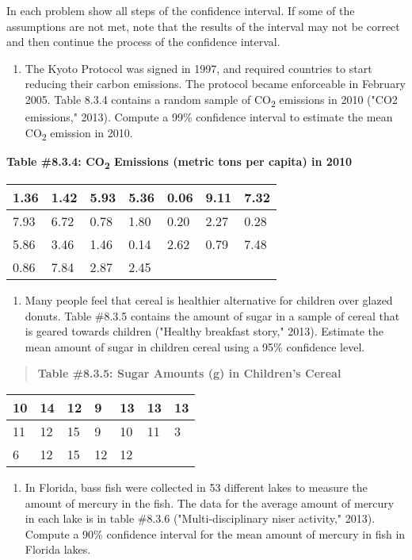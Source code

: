 \documentclass[]{book}
\providecommand{\tightlist}{%
  \setlength{\itemsep}{0pt}\setlength{\parskip}{0pt}}
\begin{document}
In each problem show all steps of the confidence interval. If some of the assumptions are not met, note that the results of the interval may not be correct and then continue the process of the confidence interval.

\begin{enumerate}
\def\labelenumi{\arabic{enumi}.}
\tightlist
\item
  The Kyoto Protocol was signed in 1997, and required countries to start reducing their carbon emissions. The protocol became enforceable in February 2005. Table 8.3.4 contains a random sample of CO\textsubscript{2} emissions in 2010 ("CO2 emissions," 2013). Compute a 99\% confidence interval to estimate the mean CO\textsubscript{2} emission in 2010.
\end{enumerate}

\textbf{Table \#8.3.4: CO\textsubscript{2} Emissions (metric tons per capita) in 2010}

\begin{longtable}[]{@{}lllllll@{}}
\toprule
1.36 & 1.42 & 5.93 & 5.36 & 0.06 & 9.11 & 7.32\tabularnewline
\midrule
\endhead
7.93 & 6.72 & 0.78 & 1.80 & 0.20 & 2.27 & 0.28\tabularnewline
5.86 & 3.46 & 1.46 & 0.14 & 2.62 & 0.79 & 7.48\tabularnewline
0.86 & 7.84 & 2.87 & 2.45 & & &\tabularnewline
\bottomrule
\end{longtable}

\begin{enumerate}
\def\labelenumi{\arabic{enumi}.}
\setcounter{enumi}{1}
\tightlist
\item
  Many people feel that cereal is healthier alternative for children over glazed donuts. Table \#8.3.5 contains the amount of sugar in a sample of cereal that is geared towards children ("Healthy breakfast story," 2013). Estimate the mean amount of sugar in children cereal using a 95\% confidence level.
\end{enumerate}

\begin{quote}
\textbf{Table \#8.3.5: Sugar Amounts (g) in Children's Cereal}
\end{quote}

\begin{longtable}[]{@{}lllllll@{}}
\toprule
10 & 14 & 12 & 9 & 13 & 13 & 13\tabularnewline
\midrule
\endhead
11 & 12 & 15 & 9 & 10 & 11 & 3\tabularnewline
6 & 12 & 15 & 12 & 12 & &\tabularnewline
\bottomrule
\end{longtable}

\begin{enumerate}
\def\labelenumi{\arabic{enumi}.}
\setcounter{enumi}{2}
\tightlist
\item
  In Florida, bass fish were collected in 53 different lakes to measure the amount of mercury in the fish. The data for the average amount of mercury in each lake is in table \#8.3.6 ("Multi-disciplinary niser activity," 2013). Compute a 90\% confidence interval for the mean amount of mercury in fish in Florida lakes.
\end{enumerate}
\end{document}
